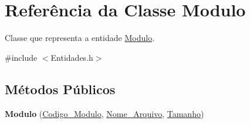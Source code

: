\hypertarget{class_modulo}{
\section{\-Referência da \-Classe \-Modulo}
\label{class_modulo}
}


\-Classe que representa a entidade \hyperlink{class_modulo}{\-Modulo}.  




{\ttfamily \#include $<$\-Entidades.\-h$>$}

\subsection*{\-Métodos \-Públicos}
\begin{DoxyCompactItemize}
\item 
\hypertarget{class_modulo_ad4dc51b22b8bd726070b683fce87fa52}{
{\bfseries \-Modulo} (\hyperlink{class_codigo___modulo}{\-Codigo\-\_\-\-Modulo}, \hyperlink{class_nome___arquivo}{\-Nome\-\_\-\-Arquivo}, \hyperlink{class_tamanho}{\-Tamanho})}
\label{class_modulo_ad4dc51b22b8bd726070b683fce87fa52}


\end{DoxyCompactItemize}
